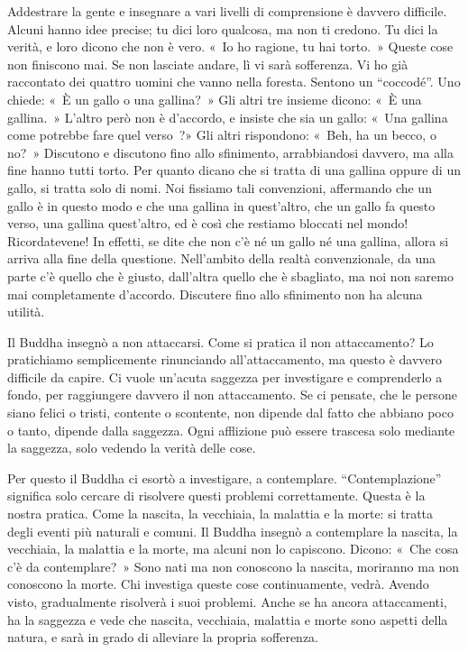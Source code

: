 Addestrare la gente e insegnare a vari livelli di comprensione è davvero
difficile. Alcuni hanno idee precise; tu dici loro qualcosa, ma non ti
credono. Tu dici la verità, e loro dicono che non è vero. «~Io ho
ragione, tu hai torto.~» Queste cose non finiscono mai. Se non lasciate
andare, lì vi sarà sofferenza. Vi ho già raccontato dei quattro uomini
che vanno nella foresta. Sentono un ``coccodé''. Uno chiede: «~È un
gallo o una gallina?~» Gli altri tre insieme dicono: «~È una gallina.~»
L'altro però non è d'accordo, e insiste che sia un gallo: «~Una gallina
come potrebbe fare quel verso~?» Gli altri rispondono: «~Beh, ha un
becco, o no?~» Discutono e discutono fino allo sfinimento, arrabbiandosi
davvero, ma alla fine hanno tutti torto. Per quanto dicano che si tratta
di una gallina oppure di un gallo, si tratta solo di nomi. Noi fissiamo
tali convenzioni, affermando che un gallo è in questo modo e che una
gallina in quest'altro, che un gallo fa questo verso, una gallina
quest'altro, ed è così che restiamo bloccati nel mondo! Ricordatevene!
In effetti, se dite che non c'è né un gallo né una gallina, allora si
arriva alla fine della questione. Nell'ambito della realtà
convenzionale, da una parte c'è quello che è giusto, dall'altra quello
che è sbagliato, ma noi non saremo mai completamente d'accordo.
Discutere fino allo sfinimento non ha alcuna utilità.

Il Buddha insegnò a non attaccarsi. Come si pratica il non attaccamento?
Lo pratichiamo semplicemente rinunciando all'attaccamento, ma questo è
davvero difficile da capire. Ci vuole un'acuta saggezza per investigare
e comprenderlo a fondo, per raggiungere davvero il non attaccamento. Se
ci pensate, che le persone siano felici o tristi, contente o scontente,
non dipende dal fatto che abbiano poco o tanto, dipende dalla saggezza.
Ogni afflizione può essere trascesa solo mediante la saggezza, solo
vedendo la verità delle cose.

Per questo il Buddha ci esortò a investigare, a contemplare.
``Contemplazione'' significa solo cercare di risolvere questi problemi
correttamente. Questa è la nostra pratica. Come la nascita, la
vecchiaia, la malattia e la morte: si tratta degli eventi più naturali e
comuni. Il Buddha insegnò a contemplare la nascita, la vecchiaia, la
malattia e la morte, ma alcuni non lo capiscono. Dicono: «~Che cosa c'è
da contemplare?~» Sono nati ma non conoscono la nascita, moriranno ma
non conoscono la morte. Chi investiga queste cose continuamente, vedrà.
Avendo visto, gradualmente risolverà i suoi problemi. Anche se ha ancora
attaccamenti, ha la saggezza e vede che nascita, vecchiaia, malattia e
morte sono aspetti della natura, e sarà in grado di alleviare la propria
sofferenza.

